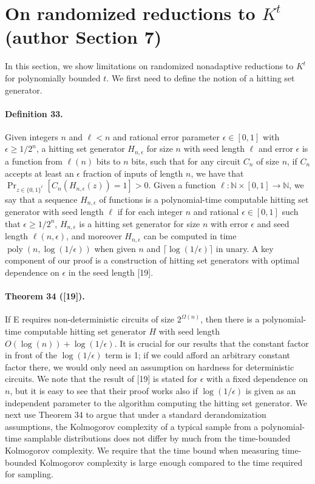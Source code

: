 \documentclass[10pt,a4paper]{article}
\begin{document}
\section*{On randomized reductions to $K^t$ (author Section 7)}
In this section, we show limitations on randomized nonadaptive reductions to $K^t$ for polynomially bounded $t$. We first need to define the notion of a hitting set generator.
\paragraph{Definition 33.} Given integers $n$ and $\ell<n$ and rational error parameter $\epsilon\in[0,1]$ with $\epsilon\ge1/2^n$, a hitting set generator $H_{n,\epsilon}$ for size $n$ with seed length $\ell$ and error $\epsilon$ is a function from $\ell(n)$ bits to $n$ bits, such that for any circuit $C_n$ of size $n$, if $C_n$ accepts at least an $\epsilon$ fraction of inputs of length $n$, we have that $\Pr_{z\in\{0,1\}^\ell}[C_n(H_{n,\epsilon}(z))=1]>0$. Given a function $\ell:\mathbb N\times[0,1]\to\mathbb N$, we say that a sequence $H_{n,\epsilon}$ of functions is a polynomial-time computable hitting set generator with seed length $\ell$ if for each integer $n$ and rational $\epsilon\in[0,1]$ such that $\epsilon\ge1/2^n$, $H_{n,\epsilon}$ is a hitting set generator for size $n$ with error $\epsilon$ and seed length $\ell(n,\epsilon)$, and moreover $H_{n,\epsilon}$ can be computed in time $\operatorname{poly}(n,\log(1/\epsilon))$ when given $n$ and $\lceil\log(1/\epsilon)\rceil$ in unary.
A key component of our proof is a construction of hitting set generators with optimal dependence on $\epsilon$ in the seed length [19].
\paragraph{Theorem 34 ([19]).} If E requires non-deterministic circuits of size $2^{\Omega(n)}$, then there is a polynomial-time computable hitting set generator $H$ with seed length $O(\log(n))+\log(1/\epsilon)$.
It is crucial for our results that the constant factor in front of the $\log(1/\epsilon)$ term is 1; if we could afford an arbitrary constant factor there, we would only need an assumption on hardness for deterministic circuits. We note that the result of [19] is stated for $\epsilon$ with a fixed dependence on $n$, but it is easy to see that their proof works also if $\log(1/\epsilon)$ is given as an independent parameter to the algorithm computing the hitting set generator.
We next use Theorem 34 to argue that under a standard derandomization assumptions, the Kolmogorov complexity of a typical sample from a polynomial-time samplable distributions does not differ by much from the time-bounded Kolmogorov complexity. We require that the time bound when measuring time-bounded Kolmogorov complexity is large enough compared to the time required for sampling.
\end{document}
